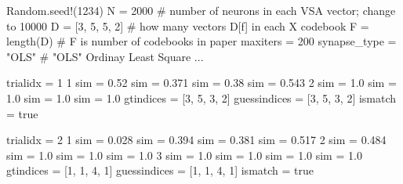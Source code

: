 
	Random.seed!(1234)
	N = 2000 # number of neurons in each VSA vector; change to 10000
	D = [3, 5, 5, 2] # how many vectors D[f] in each X codebook
	F = length(D)  # F is number of codebooks in paper
	maxiters = 200
	synapse_type = "OLS" # "OLS" Ordinay Least Square ...


trialidx = 1
1
sim = 0.52
sim = 0.371
sim = 0.38
sim = 0.543
2
sim = 1.0
sim = 1.0
sim = 1.0
sim = 1.0
gtindices = [3, 5, 3, 2]
guessindices = [3, 5, 3, 2]
ismatch = true
 
 
trialidx = 2
1
sim = 0.028
sim = 0.394
sim = 0.381
sim = 0.517
2
sim = 0.484
sim = 1.0
sim = 1.0
sim = 1.0
3
sim = 1.0
sim = 1.0
sim = 1.0
sim = 1.0
gtindices = [1, 1, 4, 1]
guessindices = [1, 1, 4, 1]
ismatch = true
 
